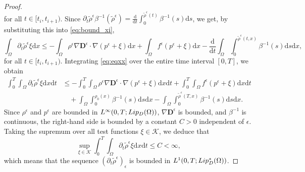 \documentclass[10pt,a4paper]{amsart}
\newcommand{\K}{\mathcal K}
\newcommand{\Lip}{\textup{Lip}}
\newcommand{\Om}{\Omega}
\newcommand{\dd}{\mathrm{d}}
\newcommand{\de}{\mathbf{D}}
\begin{document}
\begin{proof}
\begin{equation}
    \end{equation}
    for all  $t \in [t_i, t_{i+1})$.
    Since $\partial_t \tilde{\rho}^{\epsilon} \beta^{-1}(\tilde{\rho}^{\epsilon}) = \frac{\dd}{\dd t} \int_{0}^{\tilde{\rho}^{\epsilon}(t)} \beta^{-1}(s) \dd s$, we get, by substituting this into \eqref{eq:bound_xi},
    \begin{equation}\label{eq:eqxx}
        \int_{\Omega} \partial_t \tilde{\rho}^{\epsilon} \xi \dd x \leq -\int_{\Omega} \rho^\epsilon \nabla \de^\epsilon \cdot \nabla(p^\epsilon +\xi) \dd x + \int_{\Omega} f^{\epsilon} (p^{\epsilon}+\xi) \dd x - \frac{\dd}{\dd t} \int_{\Omega} \int_{0}^{\tilde{\rho}^{\epsilon}(t, x)} \beta^{-1}(s) \dd s \dd x, 
    \end{equation}
    for all $t \in [t_i, t_{i+1})$.
    Integrating \eqref{eq:eqxx} over the entire time interval $[0,T]$, we obtain
    \begin{equation*}
        \begin{aligned}
            \int_{0}^{T}\int_{\Omega} \partial_t \tilde{\rho}^{\epsilon} \xi \dd x \dd t 
            &\leq -\int_{0}^{T} \int_{\Omega} \rho^\epsilon \nabla \de^\epsilon \cdot \nabla(p^\epsilon +\xi) \dd x \dd t + \int_{0}^{T}\int_{\Omega} f^{\epsilon} (p^{\epsilon}+\xi) \dd x \dd t \\
            &\quad + \int_{\Omega}\int_{0}^{\rho_0(x)} \beta^{-1}(s)\dd s \dd x - \int_{\Omega} \int_{0}^{\tilde{\rho}^\epsilon(T, x)} \beta^{-1}(s) \dd s \dd x.
        \end{aligned}
    \end{equation*}
    Since $\rho^\epsilon$ and $p^\epsilon$ are bounded in $L^{\infty}(0,T; \Lip_{D}(\Omega))$, $\nabla \de^\epsilon$ is bounded, and $\beta^{-1}$ is continuous, the right-hand side is bounded by a constant $C > 0$ independent of $\epsilon$. Taking the supremum over all test functions $\xi \in \K$, we deduce that
    \begin{equation}
        \sup_{\xi \in \K} \int_{0}^{T} \int_{\Omega} \partial_t \tilde{\rho}^{\epsilon} \xi \dd x \dd t \leq C < \infty,
    \end{equation}
    which means that the sequence $(\partial_t \tilde{\rho}^{\epsilon})_{\epsilon}$ is bounded in $L^1(0,T; \Lip_{D}^*(\Om))$.
\end{proof}
\end{document}

